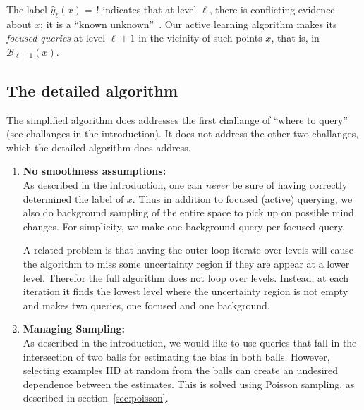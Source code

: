 \documentclass[twoside]{article}
\def\B{{\mathcal B}}
\def\yh{{\widehat{y}}}
\def\PL{{\mbox{\rm PL}}}
\begin{document}
The label $\yh_\ell(x) = \, !$ indicates that at level $\ell$, there is conflicting evidence about $x$; it is a ``known unknown''~\cite{R11}. Our active learning algorithm makes its \emph{focused queries} at level $\ell+1$ in the vicinity of such points $x$, that is, in $\B_{\ell+1}(x)$.


\fi




\subsection{The detailed algorithm}
\label{sec:detailedalgorithm}

The simplified algorithm does addresses the first challange of ``where
to query'' (see challanges in the introduction). It does not address
the other two challanges, which the detailed algorithm does address.

\begin{enumerate}
\item {\bf No smoothness assumptions:}\\
  As described in the introduction, one can \emph{never} be sure of having
  correctly determined the label of $x$. Thus in addition to focused
  (active) querying, we also do background sampling of the entire
  space to pick up on possible mind changes. For simplicity, we make
  one background query per focused query.

  A related problem is that having the outer loop iterate over levels
  will cause the algorithm to miss some uncertainty region if they are
  appear at a lower level. Therefor the full algorithm does not loop
  over levels. Instead, at each iteration it finds the lowest level
  where the uncertainty region is not empty and makes two queries, one
  focused and one background.

\item {\bf Managing Sampling:}\\
  As described in the introduction, we would like to use queries that
  fall in the intersection of two balls for estimating the bias in
  both balls. However, selecting examples IID at random from the balls
  can create an undesired dependence between the estimates. This is solved using Poisson sampling, as described in section~\ref{sec:poisson}.
\end{enumerate}
\end{document}
